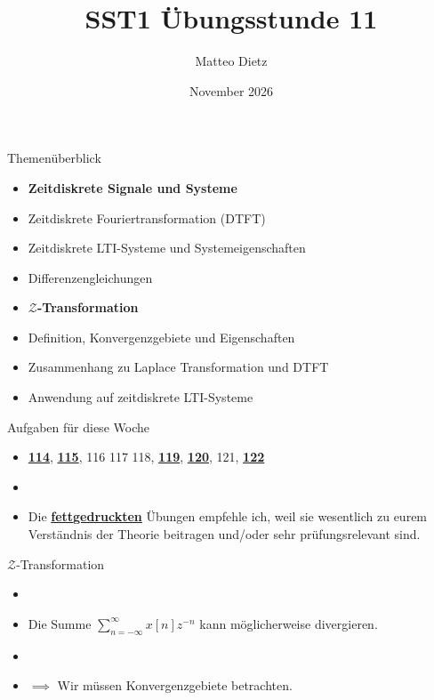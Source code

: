 \documentclass[14pt, aspectratio=169, handout]{beamer}
\title{SST1 Übungsstunde 11}
\author{Matteo Dietz}
\date{November 2026}
\begin{document}
\maketitle

\begin{frame}{Themenüberblick}
    \begin{itemize}
        \item \textbf{Zeitdiskrete Signale und Systeme}
        \item[] Zeitdiskrete Fouriertransformation (DTFT)
        \item[] Zeitdiskrete LTI-Systeme und Systemeigenschaften
        \item[] Differenzengleichungen
        \item \textbf{$\mathcal{Z}$-Transformation}
        \item[] Definition, Konvergenzgebiete und Eigenschaften
        \item[] Zusammenhang zu Laplace Transformation und DTFT
        \item[] Anwendung auf zeitdiskrete LTI-Systeme
    \end{itemize}
\end{frame}

\begin{frame}{Aufgaben für diese Woche}
    \begin{itemize}
      \item[] \underline{\textbf{114}}, \underline{\textbf{115}}, 116 117 118, \underline{\textbf{119}}, \underline{\textbf{120}}, 121, \underline{\textbf{122}}
        \item[] 
        \item[] Die \underline{\textbf{fettgedruckten}} Übungen empfehle ich, weil sie wesentlich zu eurem Verständnis der Theorie beitragen und/oder sehr prüfungsrelevant sind.
    \end{itemize}
\end{frame}

\begin{frame}
{$\mathcal{Z}$-Transformation}
\begin{itemize}
    \item[] 
    \item Die Summe $\sum_{n=-\infty}^\infty x[n]z^{-n}$ kann möglicherweise divergieren.
    \item[] 
    \item[] $\implies$ Wir müssen Konvergenzgebiete betrachten.
\end{itemize}

\end{frame}
\end{document}
